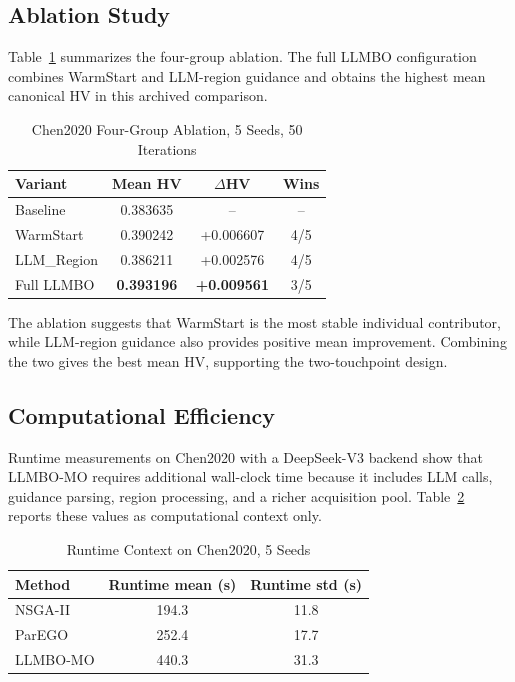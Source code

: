 \documentclass[journal]{IEEEtran}
\begin{document}
\subsection{Ablation Study}

Table~\ref{tab:ablation} summarizes the four-group ablation. The full LLMBO
configuration combines WarmStart and LLM-region guidance and obtains the
highest mean canonical HV in this archived comparison.

\begin{table}[htbp]
\caption{Chen2020 Four-Group Ablation, 5 Seeds, 50 Iterations}
\label{tab:ablation}
\centering
\begin{tabular}{lccc}
\toprule
Variant & Mean HV & $\Delta$HV & Wins \\
\midrule
Baseline & 0.383635 & -- & -- \\
WarmStart & 0.390242 & +0.006607 & 4/5 \\
LLM\_Region & 0.386211 & +0.002576 & 4/5 \\
Full LLMBO & \textbf{0.393196} & \textbf{+0.009561} & 3/5 \\
\bottomrule
\end{tabular}
\end{table}

The ablation suggests that WarmStart is the most stable individual contributor,
while LLM-region guidance also provides positive mean improvement. Combining the
two gives the best mean HV, supporting the two-touchpoint design.

\subsection{Computational Efficiency}

Runtime measurements on Chen2020 with a DeepSeek-V3 backend show that LLMBO-MO
requires additional wall-clock time because it includes LLM calls, guidance
parsing, region processing, and a richer acquisition pool. Table~\ref{tab:time}
reports these values as computational context only.

\begin{table}[htbp]
\caption{Runtime Context on Chen2020, 5 Seeds}
\label{tab:time}
\centering
\begin{tabular}{lcc}
\toprule
Method & Runtime mean (s) & Runtime std (s) \\
\midrule
NSGA-II & 194.3 & 11.8 \\
ParEGO & 252.4 & 17.7 \\
LLMBO-MO & 440.3 & 31.3 \\
\bottomrule
\end{tabular}
\end{table}
\end{document}
